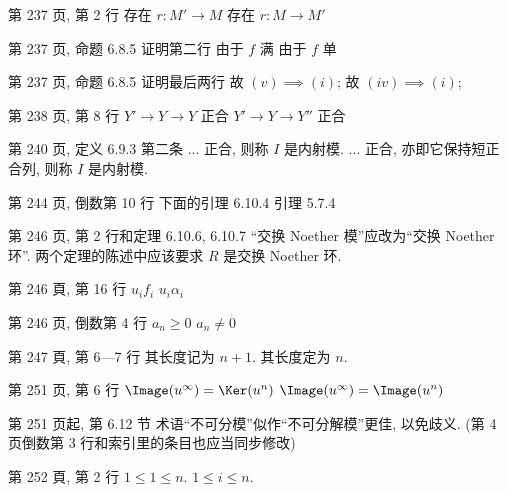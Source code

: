 \documentclass{AJerrata}
\begin{document}
\begin{Errata}
        \item[第 237 页, 第 2 行]
        \Orig 存在 $r: M' \to M$
        \Corr 存在 $r: M \to M'$
        
        \item[第 237 页, 命题 6.8.5 证明第二行]
        \Orig 由于 $f$ 满
        \Corr 由于 $f$ 单
        
        \item[第 237 页, 命题 6.8.5 证明最后两行]
        \Orig 故 $(v) \implies (i)$;
        \Corr 故 $(iv) \implies (i)$;
        
        \item[第 238 页, 第 8 行]
        \Orig $Y' \to Y \to Y$ 正合
        \Corr $Y' \to Y \to Y''$ 正合
        
       \item[第 240 页, 定义 6.9.3 第二条]
       \Orig ... 正合, 则称 $I$ 是内射模.
       \Corr ... 正合, 亦即它保持短正合列, 则称 $I$ 是内射模.
        
   		\item[第 244 页, 倒数第 10 行]
        \Orig 下面的引理 6.10.4
        \Corr 引理 5.7.4
        
   		\item[第 246 页, 第 2 行和定理 6.10.6, 6.10.7]
		``交换 Noether 模''应改为``交换 Noether 环''. 两个定理的陈述中应该要求 $R$ 是交换 Noether 环.
        
        \item[第 246 頁, 第 16 行]
        \Orig $u_i f_i$
        \Corr $u_i \alpha_i$

		\item[第 246 页, 倒数第 4 行]
		\Orig $a_n \geq 0$
		\Corr $a_n \neq 0$

        \item[第 247 頁, 第 6---7 行]
        \Orig 其长度记为 $n+1$.
        \Corr 其长度定为 $n$.

		\item[第 251 页, 第 6 行]
		\Orig $\Image(u^\infty) = \Ker(u^n)$
		\Corr $\Image(u^\infty) = \Image(u^n)$

  		\item[第 251 页起, 第 6.12 节]
		术语``不可分模''似作``不可分解模''更佳, 以免歧义. (第 4 页倒数第 3 行和索引里的条目也应当同步修改)

        \item[第 252 頁, 第 2 行]
        \Orig $1 \leq 1 \leq n$.
        \Corr $1 \leq i \leq n$.
        

\end{Errata}
\end{document}
